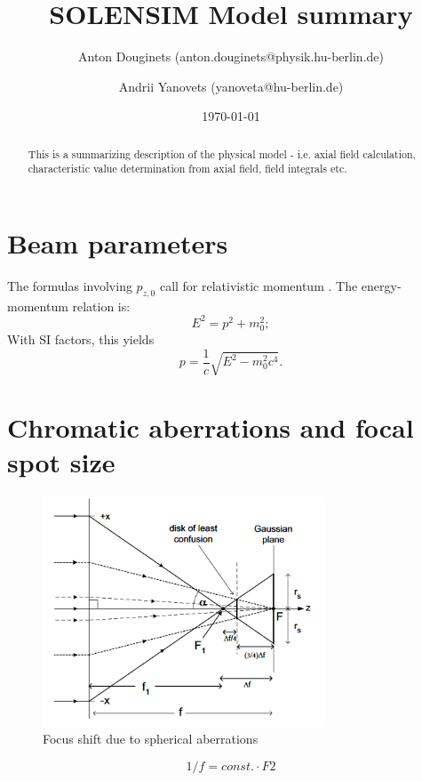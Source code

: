 \documentclass[a4paper,12pt]{article}
\title{SOLENSIM Model summary}
\author{Anton Douginets (anton.douginets@physik.hu-berlin.de)
	\and
	Andrii Yanovets (yanoveta@hu-berlin.de)}
\date{\today}
\begin{document}
\thispagestyle{empty}
\maketitle

\begin{abstract}
This is a summarizing description of the physical model - i.e. axial field calculation, characteristic value determination from axial field, field integrals etc.
\end{abstract}

\tableofcontents

\newpage


\section{Beam parameters}

The formulas involving $p_{z,0}$ call for relativistic momentum \cite[p. 27]{Disser}. The energy-momentum relation is:
\[
E^2 = p^2 + m_0^2;
\]
With SI factors, this yields
\begin{equation}
	p = \frac{1}{c}\sqrt{E^2 - m_0^2c^4}.
\end{equation}
\section{Chromatic aberrations and focal spot size}

\begin{figure}[h]
  \centering
  \includegraphics[width=0.75\textwidth]{cs_illustration}
  \caption{Focus shift due to spherical aberrations}
\end{figure}

\[
1/f=const.\cdotp F2
\]
\end{document}
